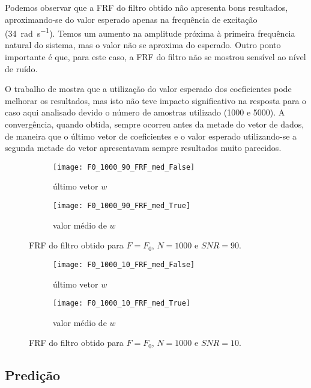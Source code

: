 Podemos observar que a FRF do filtro obtido não apresenta bons resultados, aproximando-se do valor esperado apenas na frequência de excitação (\SI{34}{\radian \per \s}). Temos um aumento na amplitude próxima à primeira frequência natural do sistema, mas o valor não se aproxima do esperado. Outro ponto importante é que, para este caso, a FRF do filtro não se mostrou sensível ao nível de ruído.  

O trabalho de \citet{castello2005experimental} mostra que a utilização do valor esperado dos coeficientes pode melhorar os resultados, mas isto não teve impacto significativo na resposta para o caso aqui analisado devido o número de amostras utilizado (1000 e 5000). A convergência, quando obtida, sempre ocorreu antes da metade do vetor de dados, de maneira que o último vetor de coeficientes e o valor esperado utilizando-se a segunda metade do vetor apresentavam sempre resultados muito parecidos.

\begin{figure}
	\centering
	\begin{subfigure}{0.9\textwidth}
		\centering
		\texttt{[image: F0\_1000\_90\_FRF\_med\_False]}
		\caption{último vetor $ w $}
		\label{fig:F0_1000_90_FRF_med_False}
	\end{subfigure}
	\begin{subfigure}{0.9\textwidth}
		\centering
		\texttt{[image: F0\_1000\_90\_FRF\_med\_True]}
		\caption{valor médio de $ w $}
		\label{fig:F0_1000_90_FRF_med_True}
	\end{subfigure}
	\caption{FRF do filtro obtido para $ F=F_0 $, $ N=1000 $ e $ SNR=90 $.}
\end{figure}

\begin{figure}
	\centering
	\begin{subfigure}{0.9\textwidth}
		\centering
		\texttt{[image: F0\_1000\_10\_FRF\_med\_False]}
		\caption{último vetor $ w $}
		\label{fig:F0_1000_10_FRF_med_False}
	\end{subfigure}
	\begin{subfigure}{0.9\textwidth}
		\centering
		\texttt{[image: F0\_1000\_10\_FRF\_med\_True]}
		\caption{valor médio de $ w $}
		\label{fig:F0_1000_10_FRF_med_True}
	\end{subfigure}
	\caption{FRF do filtro obtido para $ F=F_0 $, $ N=1000 $ e $ SNR=10 $.}
	\label{fig:F0_1000_10_FRF}
\end{figure}

\subsection{Predição}

